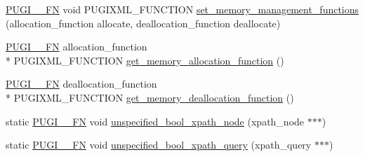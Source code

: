 \begin{DoxyCompactItemize}
\hyperlink{pugixml_8cpp_a82c335af3ca48cdb209c506bf8dd6ad2}{P\-U\-G\-I\-\_\-\-\_\-\-F\-N} void P\-U\-G\-I\-X\-M\-L\-\_\-\-F\-U\-N\-C\-T\-I\-O\-N \hyperlink{namespacepugi_a993c6b7947c1dec98936510d9e5fe778}{set\-\_\-memory\-\_\-management\-\_\-functions} (allocation\-\_\-function allocate, deallocation\-\_\-function deallocate)
\item 
\hyperlink{pugixml_8cpp_a82c335af3ca48cdb209c506bf8dd6ad2}{P\-U\-G\-I\-\_\-\-\_\-\-F\-N} allocation\-\_\-function \\*
P\-U\-G\-I\-X\-M\-L\-\_\-\-F\-U\-N\-C\-T\-I\-O\-N \hyperlink{namespacepugi_ab36e5aed4e5c952687b42d69daf981eb}{get\-\_\-memory\-\_\-allocation\-\_\-function} ()
\item 
\hyperlink{pugixml_8cpp_a82c335af3ca48cdb209c506bf8dd6ad2}{P\-U\-G\-I\-\_\-\-\_\-\-F\-N} deallocation\-\_\-function \\*
P\-U\-G\-I\-X\-M\-L\-\_\-\-F\-U\-N\-C\-T\-I\-O\-N \hyperlink{namespacepugi_a9fcabe4b52fbef0f133fab9ff97652ca}{get\-\_\-memory\-\_\-deallocation\-\_\-function} ()
\item 
static \hyperlink{pugixml_8cpp_a82c335af3ca48cdb209c506bf8dd6ad2}{P\-U\-G\-I\-\_\-\-\_\-\-F\-N} void \hyperlink{namespacepugi_abca519e72b848d2ebadf5250727da6c5}{unspecified\-\_\-bool\-\_\-xpath\-\_\-node} (xpath\-\_\-node $\ast$$\ast$$\ast$)
\item 
static \hyperlink{pugixml_8cpp_a82c335af3ca48cdb209c506bf8dd6ad2}{P\-U\-G\-I\-\_\-\-\_\-\-F\-N} void \hyperlink{namespacepugi_a41b925609dde7657664cf68c6506838b}{unspecified\-\_\-bool\-\_\-xpath\-\_\-query} (xpath\-\_\-query $\ast$$\ast$$\ast$)
\end{DoxyCompactItemize}


